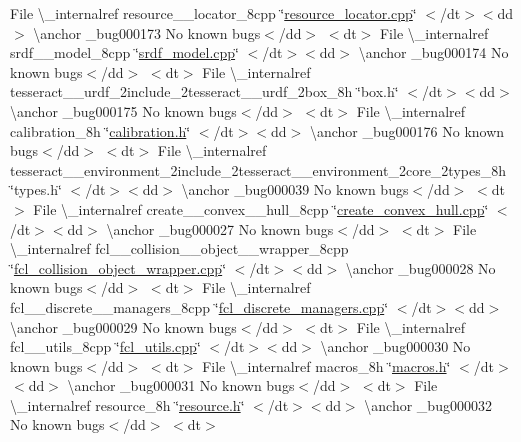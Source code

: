 \begin{DoxyRefList}
\+File \textbackslash{}\+\_\+internalref resource\+\_\+\+\_\+locator\+\_\+8cpp \char`\"{}\mbox{\hyperlink{resource__locator_8cpp}{resource\+\_\+locator.\+cpp}}\char`\"{} $<$/dt$>$$<$dd$>$ \textbackslash{}anchor \+\_\+bug000173 No known bugs$<$/dd$>$ $<$dt$>$
\+File \textbackslash{}\+\_\+internalref srdf\+\_\+\+\_\+model\+\_\+8cpp \char`\"{}\mbox{\hyperlink{srdf__model_8cpp}{srdf\+\_\+model.\+cpp}}\char`\"{} $<$/dt$>$$<$dd$>$ \textbackslash{}anchor \+\_\+bug000174 No known bugs$<$/dd$>$ $<$dt$>$
\+File \textbackslash{}\+\_\+internalref tesseract\+\_\+\+\_\+urdf\+\_\+2include\+\_\+2tesseract\+\_\+\+\_\+urdf\+\_\+2box\+\_\+8h \char`\"{}box.\+h\char`\"{} $<$/dt$>$$<$dd$>$ \textbackslash{}anchor \+\_\+bug000175 No known bugs$<$/dd$>$ $<$dt$>$
\+File \textbackslash{}\+\_\+internalref calibration\+\_\+8h \char`\"{}\mbox{\hyperlink{calibration_8h}{calibration.\+h}}\char`\"{} $<$/dt$>$$<$dd$>$ \textbackslash{}anchor \+\_\+bug000176 No known bugs$<$/dd$>$ $<$dt$>$
\+File \textbackslash{}\+\_\+internalref tesseract\+\_\+\+\_\+environment\+\_\+2include\+\_\+2tesseract\+\_\+\+\_\+environment\+\_\+2core\+\_\+2types\+\_\+8h \char`\"{}types.\+h\char`\"{} $<$/dt$>$$<$dd$>$ \textbackslash{}anchor \+\_\+bug000039 No known bugs$<$/dd$>$ $<$dt$>$
\+File \textbackslash{}\+\_\+internalref create\+\_\+\+\_\+convex\+\_\+\+\_\+hull\+\_\+8cpp \char`\"{}\mbox{\hyperlink{create__convex__hull_8cpp}{create\+\_\+convex\+\_\+hull.\+cpp}}\char`\"{} $<$/dt$>$$<$dd$>$ \textbackslash{}anchor \+\_\+bug000027 No known bugs$<$/dd$>$ $<$dt$>$
\+File \textbackslash{}\+\_\+internalref fcl\+\_\+\+\_\+collision\+\_\+\+\_\+object\+\_\+\+\_\+wrapper\+\_\+8cpp \char`\"{}\mbox{\hyperlink{fcl__collision__object__wrapper_8cpp}{fcl\+\_\+collision\+\_\+object\+\_\+wrapper.\+cpp}}\char`\"{} $<$/dt$>$$<$dd$>$ \textbackslash{}anchor \+\_\+bug000028 No known bugs$<$/dd$>$ $<$dt$>$
\+File \textbackslash{}\+\_\+internalref fcl\+\_\+\+\_\+discrete\+\_\+\+\_\+managers\+\_\+8cpp \char`\"{}\mbox{\hyperlink{fcl__discrete__managers_8cpp}{fcl\+\_\+discrete\+\_\+managers.\+cpp}}\char`\"{} $<$/dt$>$$<$dd$>$ \textbackslash{}anchor \+\_\+bug000029 No known bugs$<$/dd$>$ $<$dt$>$
\+File \textbackslash{}\+\_\+internalref fcl\+\_\+\+\_\+utils\+\_\+8cpp \char`\"{}\mbox{\hyperlink{fcl__utils_8cpp}{fcl\+\_\+utils.\+cpp}}\char`\"{} $<$/dt$>$$<$dd$>$ \textbackslash{}anchor \+\_\+bug000030 No known bugs$<$/dd$>$ $<$dt$>$
\+File \textbackslash{}\+\_\+internalref macros\+\_\+8h \char`\"{}\mbox{\hyperlink{macros_8h}{macros.\+h}}\char`\"{} $<$/dt$>$$<$dd$>$ \textbackslash{}anchor \+\_\+bug000031 No known bugs$<$/dd$>$ $<$dt$>$
\+File \textbackslash{}\+\_\+internalref resource\+\_\+8h \char`\"{}\mbox{\hyperlink{resource_8h}{resource.\+h}}\char`\"{} $<$/dt$>$$<$dd$>$ \textbackslash{}anchor \+\_\+bug000032 No known bugs$<$/dd$>$ $<$dt$>$
$$
\end{DoxyRefList}
